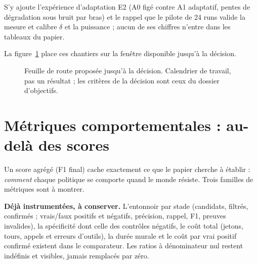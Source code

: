 \documentclass[11pt,a4paper]{article}
\begin{document}
S'y ajoute l'exp\'erience d'adaptation E2 (A0 fig\'e contre A1 adaptatif, pentes de d\'egradation sous bruit par bras) et le rappel que le pilote de 24 runs valide la mesure et calibre $\delta$ et la puissance ; aucun de ses chiffres n'entre dans les tableaux du papier.

La figure~\ref{fig:route} place ces chantiers sur la fen\^etre disponible jusqu'\`a la d\'ecision.

\begin{figure}[htbp]
\centering
{}
\caption{Feuille de route propos\'ee jusqu'\`a la d\'ecision. Calendrier de travail, pas un r\'esultat ; les crit\`eres de la d\'ecision sont ceux du dossier d'objectifs.}
\label{fig:route}
\end{figure}

\section{M\'etriques comportementales : au-del\`a des scores}
\label{sec:metriques}

Un score agr\'eg\'e (F1 final) cache exactement ce que le papier cherche \`a \'etablir : \emph{comment} chaque politique se comporte quand le monde r\'esiste. Trois familles de m\'etriques sont \`a montrer.

\textbf{D\'ej\`a instrument\'ees, \`a conserver.} L'entonnoir par stade (candidats, filtr\'es, confirm\'es ; vrais/faux positifs et n\'egatifs, pr\'ecision, rappel, F1, preuves invalides), la sp\'ecificit\'e dont celle des contr\^oles n\'egatifs, le co\^ut total (jetons, tours, appels et erreurs d'outils), la dur\'ee murale et le co\^ut par vrai positif confirm\'e existent dans le comparateur. Les ratios \`a d\'enominateur nul restent ind\'efinis et visibles, jamais remplac\'es par z\'ero.
\end{document}
